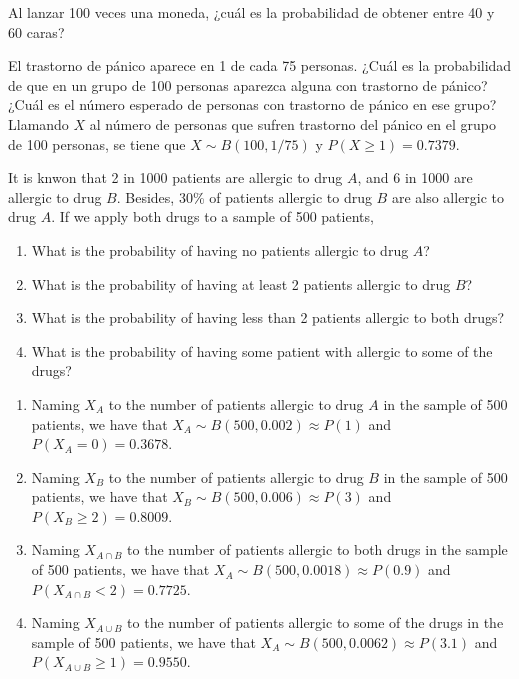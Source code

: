{Al lanzar 100 veces una moneda, ¿cuál es la probabilidad de obtener entre 40 y 60 caras?
}
{}
{}


{El trastorno de pánico aparece en 1 de cada 75 personas.
¿Cuál es la probabilidad de que en un grupo de 100 personas aparezca alguna con trastorno de pánico?
¿Cuál es el número esperado de personas con trastorno de pánico en ese grupo?
}
{Llamando $X$ al número de personas que sufren trastorno del pánico en el grupo de 100 personas, se tiene que $X\sim
B(100,1/75)$ y $P(X\geq 1)=0.7379$.}
{}


{It is knwon that 2 in 1000 patients are allergic to drug $A$, and 6 in 1000 are allergic to drug $B$.
Besides, 30\% of patients allergic to drug $B$ are also allergic to drug $A$.
If we apply both drugs to a sample of 500 patients,
\begin{enumerate}
\item What is the probability of having no patients allergic to drug $A$?
\item What is the probability of having at least 2 patients allergic to drug $B$?
\item What is the probability of having less than 2 patients allergic to both drugs?
\item What is the probability of having some patient with allergic to some of the drugs?
\end{enumerate}
}
{
\begin{enumerate}
\item Naming $X_A$ to the number of patients allergic to drug $A$ in the sample of 500 patients, we have that $X_A\sim B(500,0.002)\approx P(1)$ and $P(X_A=0)=0.3678$.
\item Naming $X_B$ to the number of patients allergic to drug $B$ in the sample of 500 patients, we have that $X_B\sim B(500,0.006)\approx P(3)$ and $P(X_B\geq 2)=0.8009$.
\item Naming $X_{A\cap B}$ to the number of patients allergic to both drugs in the sample of 500 patients, we have that $X_A\sim B(500,0.0018)\approx P(0.9)$ and $P(X_{A\cap B}<2)=0.7725$.
\item Naming $X_{A\cup B}$ to the number of patients allergic to some of the drugs in the sample of 500 patients, we have that $X_A\sim B(500,0.0062)\approx P(3.1)$ and $P(X_{A\cup B}\geq 1)=0.9550$.
\end{enumerate}
}
{}


